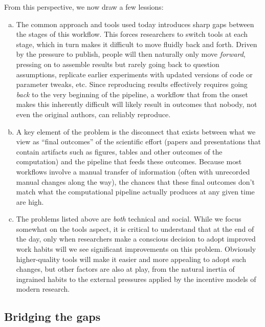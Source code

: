 \documentclass[ChapterTOCs,krantz2]{krantz} %
\begin{document}
From this perspective, we now draw a few lessions:

\begin{enumerate}[(a)]
  \item The common approach and tools used today introduces sharp gaps between
    the stages of this workflow.  This forces researchers to switch tools at
    each stage, which in turn makes it difficult to move fluidly back and
    forth.  Driven by the pressure to publish, people will then naturally only
    move \emph{forward}, pressing on to assemble results but rarely going back
    to question assumptions, replicate earlier experiments with updated
    versions of code or parameter tweaks, etc.  Since reproducing results
    effectively requires going \emph{back} to the very beginning of the
    pipeline, a workflow that from the onset makes this inherently difficult
    will likely result in outcomes that nobody, not even the original authors,
    can reliably reproduce.

  \item A key element of the problem is the disconnect that exists between what
    we view as ``final outcomes'' of the scientific effort (papers and
    presentations that contain artifacts such as figures, tables and other
    outcomes of the computation) and the pipeline that feeds these outcomes.
    Because most workflows involve a manual transfer of information (often with
    unrecorded manual changes along the way), the chances that these final
    outcomes don't match what the computational pipeline actually produces at
    any given time are high.

  \item The problems listed above are \emph{both} technical and social.  While
    we focus somewhat on the tools aspect, it is critical to understand that at
    the end of the day, only when researchers make a conscious decision to
    adopt improved work habits will we see significant improvements on this
    problem.  Obviously higher-quality tools will make it easier and more
    appealing to adopt such changes, but other factors are also at play, from
    the natural inertia of ingrained habits to the external pressures applied
    by the incentive models of modern research.
\end{enumerate}


\subsection{Bridging the gaps}
\end{document}
